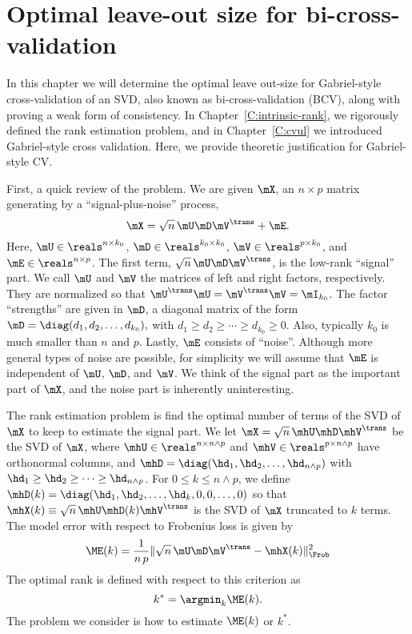 \chapter[Optimal leave-out size for BCV]{Optimal leave-out size for bi-cross-validation}
\label{C:optimal-leave-out}

In this chapter we will determine the optimal leave out-size for Gabriel-style
cross-validation of an SVD, also known as bi-cross-validation (BCV), along
with proving a weak form of consistency.  In Chapter~\ref{C:intrinsic-rank},
we rigorously defined the rank estimation problem, and in 
Chapter~\ref{C:cvul} we introduced Gabriel-style cross validation.  Here, we 
provide theoretic justification for Gabriel-style CV.

First, a quick review of the problem.  We are given $\mX$, an $n \times p$ matrix generating by a ``signal-plus-noise'' process, 
\[
    \mX = \sqrt{n} \, \mU \mD \mV^\trans + \mE.
\]
Here, $\mU \in \reals^{n \times k_0}$, $\mD \in \reals^{k_0 \times k_0}$,
$\mV \in \reals^{p \times k_0}$, and $\mE \in \reals^{n \times p}$.  The first
term, $\sqrt{n} \, \mU \mD \mV^\trans$, is the low-rank ``signal'' part.  We call 
$\mU$ and $\mV$ the matrices of left and right factors, respectively.  They 
are normalized so that $\mU^\trans \mU = \mV^\trans \mV = \mI_{k_0}$.  The 
factor ``strengths'' are given in $\mD$, a diagonal matrix of the form
\(
    \mD =
        \diag( d_1, d_2, \ldots, d_{k_0}),
\)
with $d_1 \geq d_2 \geq \cdots \geq d_{k_0} \geq 0$.  Also, typically $k_0$ is 
much smaller than $n$ and $p$.  Lastly, $\mE$ consists of ``noise''.  Although more general types of noise are possible, for simplicity we will assume that $\mE$ is independent of $\mU$, $\mD$, and $\mV$.  We think 
of the signal part as the important part of $\mX$, and the noise part is 
inherently uninteresting.

The rank estimation problem is find the optimal number of terms of the SVD of $\mX$ to keep to estimate the signal part.  We let 
$\mX = \sqrt{n} \, \mhU \mhD \mhV^\trans$ be the SVD of $\mX$, where 
$\mhU \in \reals^{n \times n \wedge p}$ and 
$\mhV \in \reals^{p \times n \wedge p}$ have orthonormal columns, and
\(
    \mhD = \diag(
        \hd_1, \hd_2, \ldots, \hd_{n \wedge p}
    )
\)
with $\hd_1 \geq \hd_2 \geq \cdots \geq \hd_{n \wedge p}$.  For $0 \leq k \leq n \wedge p$, we define
\(
    \mhD(k) = \diag(
        \hd_1, \hd_2, \ldots, \hd_k, 0, 0, \ldots, 0
    )
\)
so that $\mhX(k) \equiv \sqrt{n} \, \mhU \mhD(k) \mhV^\trans$ is the SVD of $\mX$ truncated to $k$ terms.  The model error with respect to Frobenius loss is given by
\[
    \ME(k) = \frac{1}{n \, p}
             \| \sqrt{n} \, \mU \mD \mV^\trans - \mhX(k) \|_\Frob^2
\]
The optimal rank is defined with respect to this criterion as
\[
    k^\ast = \argmin_k \ME(k).
\]
The problem we consider is how to estimate $\ME(k)$ or $k^\ast$.


